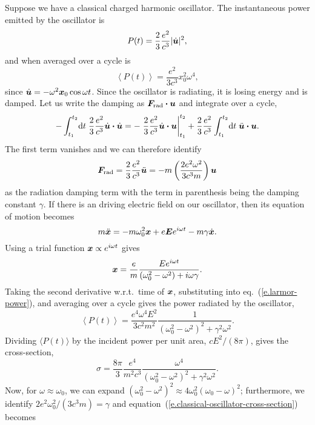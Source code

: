 Suppose we have a classical charged harmonic oscillator.  The instantaneous power emitted by the oscillator is
\begin{equation}\label{e.larmor-power}
	 P(t) = \frac{2}{3}\frac{e^{2}}{c^{3}} |\dot{\bm{u}}|^{2},
\end{equation}
and when averaged over a cycle is
\begin{equation}\label{e.oscillator-power}
	 \left\langle P(t) \right\rangle = \frac{e^{2}}{3c^{3}}x_{0}^{2} \omega^{4},
\end{equation}
since $\dot{\bm{u}} = -\omega^{2}\bm{x}_{0}\cos \omega t$. Since the oscillator is radiating, it is losing energy and is damped. Let us write the damping as $\bm{F}_{\mathrm{rad}}\bm{\cdot} \bm{u}$ and integrate over a cycle,
\[  -\int_{t_{1}}^{t_{2}}\!\mathrm{d} t\;\frac{2}{3}\frac{e^{2}}{c^{3}}\dot{\bm{u}}\bm{\cdot}\dot{\bm{u}} 
	= -\left.\frac{2}{3}\frac{e^{2}}{c^{3}}\dot{\bm{u}}\bm{\cdot}\bm{u}\right|_{t_{1}}^{t_{2}} 
	+ \frac{2}{3}\frac{e^{2}}{c^{3}} \int_{t_{1}}^{t_{2}}\!\mathrm{d} t\;\ddot{\bm{u}}\bm{\cdot}\bm{u}. 
\]
The first term vanishes and we can therefore identify 
\[ 
	\bm{F}_{\mathrm{rad}} = \frac{2}{3}\frac{e^{2}}{c^{3}}\ddot{\bm{u}} 
	= -m\left(\frac{2e^{2}\omega^{2}}{3c^{3}m}\right)\bm{u}
\]
as the radiation damping term with the term in parenthesis being the damping constant $\gamma$. 
If there is an driving electric field on our oscillator, then its equation of motion becomes
\begin{equation}\label{e.eq-sho}
	m\ddot{\bm{x}} = -m\omega_{0}^{2}\bm{x} + e\bm{E}e^{i\omega t} - m\gamma \dot{\bm{x}}.
\end{equation}
Using a trial function $\bm{x}\propto e^{i\omega t}$ gives
\[
	\bm{x} = \frac{e}{m}\frac{E e^{i\omega t}}{(\omega_{0}^{2}-\omega^{2}) + i\omega\gamma}.
\]
Taking the second derivative w.r.t.\ time of $\bm{x}$, substituting into eq.~(\ref{e.larmor-power}), and averaging over a cycle gives the power radiated by the oscillator,
\[
	\left\langle P(t)\right\rangle = \frac{e^{4}\omega^{4} E^{2}}{3 c^{2}m^{2}}
	\frac{1}{(\omega_{0}^{2}-\omega^{2})^{2} + \gamma^{2}\omega^{2}}.
\]
Dividing $\langle P(t)\rangle$ by the incident power per unit area, $cE^{2}/(8\pi)$, gives the cross-section,
\begin{equation}\label{e.classical-oscillator-cross-section}
	\sigma = \frac{8\pi}{3}\frac{e^{4}}{m^{2}c^{3}}
	\frac{\omega^{4}}{(\omega_{0}^{2}-\omega^{2})^{2} + \gamma^{2}\omega^{2}}.
\end{equation}
Now, for $\omega \approx \omega_{0}$, we can expand $(\omega_{0}^{2}-\omega^{2})^{2} \approx 4\omega_{0}^{2}(\omega_{0}-\omega)^{2}$; furthermore, we identify $2e^{2}\omega_{0}^{2}/(3c^{3}m) = \gamma$ and equation~(\ref{e.classical-oscillator-cross-section}) becomes
